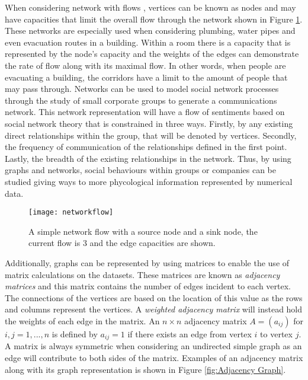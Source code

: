 When considering network with flows \cite{ford1956network}, vertices can be known as nodes and may have capacities that limit the overall flow through the network shown in Figure \ref{fig:Network Flow}. These networks are especially used when considering plumbing, water pipes and even evacuation routes in a building. Within a room there is a capacity that is represented by the node's capacity and the weights of the edges can demonstrate the rate of flow along with its maximal flow. In other words, when people are evacuating a building, the corridors have a limit to the amount of people that may pass through. Networks can be used to model social network processes through the study of small corporate groups to generate a communications network. This network representation will have a flow of sentiments based on social network theory \cite{ZACHARY1984259} that is constrained in three ways. Firstly, by any existing direct relationships within the group, that will be denoted by vertices. Secondly, the frequency of communication of the relationships defined in the first point. Lastly, the breadth of the existing relationships in the network. Thus, by using graphs and networks, social behaviours within groups or companies can be studied giving ways to more phycological information represented by numerical data.

\begin{figure}[!htb]
\centering
\texttt{[image: networkflow]}
\caption{A simple network flow with a source node and a sink node, the current flow is 3 and the edge capacities are shown.}
\label{fig:Network Flow}
\end{figure}

Additionally, graphs can be represented by using matrices to enable the use of matrix calculations on the datasets. These matrices are known as \emph{adjacency matrices} \cite{KnauerU.2011Agt:} and this matrix contains the number of edges incident to each vertex. The connections of the vertices are based on the location of this value as the rows and columns represent the vertices. A \emph{weighted adjacency matrix} will instead hold the weights of each edge in the matrix. An $n \times n$ adjacency matrix $A = (a_{ij})$ for $ i, j = 1, ..., n$ is defined by $a_{ij} = 1$ if there exists an edge from vertex $i$ to vertex $j$. A matrix is always symmetric when considering an undirected simple graph as an edge will contribute to both sides of the matrix. Examples of an adjacency matrix along with its graph representation is shown in Figure \ref{fig:Adjacency Graph}.
\newline

